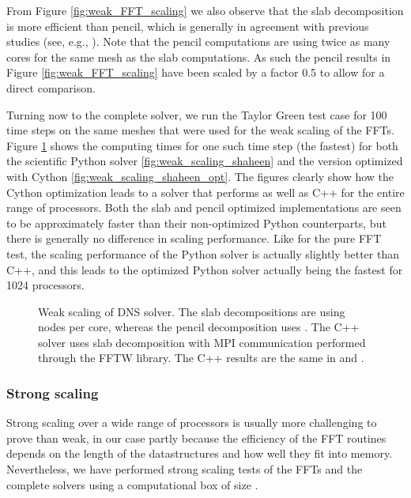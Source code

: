\documentclass[final,3p,times,twocolumn]{elsarticle}
\begin{document}
From Figure \ref{fig:weak_FFT_scaling} we also observe that the slab 
decomposition is more efficient than pencil, which is generally in agreement 
with previous studies (see, e.g., \cite{pekurovsky2012}). Note that the pencil 
computations are using twice as many cores for the same mesh as the slab 
computations. As such the pencil results in Figure \ref{fig:weak_FFT_scaling} 
have been scaled by a factor 0.5 to allow for a direct comparison. 

Turning now to the complete solver, we run the Taylor Green test case for 100 
time steps on the same meshes that were used for the weak scaling of the FFTs. 
Figure \ref{fig:Weak_scaling} shows the computing times for one such time step 
(the fastest) for both the scientific Python solver 
\ref{fig:weak_scaling_shaheen} 
and the version optimized with Cython \ref{fig:weak_scaling_shaheen_opt}.
The figures clearly show how the Cython optimization leads to a solver that 
performs as well as C++ for the entire range of processors. Both the slab and 
pencil optimized implementations are seen to be approximately  faster 
than their non-optimized Python counterparts, but there is generally no 
difference in scaling performance. Like for the pure FFT test, the scaling 
performance of the Python solver is actually slightly better  than C++, and 
this leads to the optimized Python solver actually being the fastest for 1024 
processors.

\begin{figure}[ht!]
\caption{Weak scaling of DNS solver. The slab decompositions are using  nodes per core, whereas the pencil decomposition uses . The C++ solver uses slab decomposition with MPI communication performed through the FFTW library. The C++ results are the same in  and .}
\label{fig:Weak_scaling}
\end{figure}

\subsubsection{Strong scaling}
\label{sec:strong_scaling}

Strong scaling over a wide range of processors is usually more challenging
to prove than weak, in our case partly because the efficiency of the FFT 
routines depends on the length of the datastructures and how well they fit into
memory. Nevertheless, we have performed strong scaling tests of the FFTs and the complete solvers using a computational box of size . 
\end{document}
